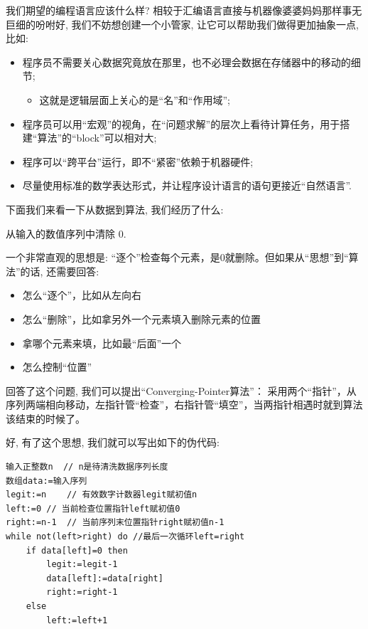 我们期望的编程语言应该什么样? 相较于汇编语言直接与机器像婆婆妈妈那样事无巨细的吩咐好, 我们不妨想创建一个小管家, 让它可以帮助我们做得更加抽象一点, 比如: 

\begin{itemize}
	\item 程序员不需要关心数据究竟放在那里，也不必理会数据在存储器中的移动的细节;
	\begin{itemize}
		\item 这就是逻辑层面上关心的是“名”和“作用域”;
	\end{itemize}
	\item 程序员可以用“宏观”的视角，在“问题求解”的层次上看待计算任务，用于搭建“算法”的“block”可以相对大;
	\item 程序可以“跨平台”运行，即不“紧密”依赖于机器硬件;
	\item 尽量使用标准的数学表达形式，并让程序设计语言的语句更接近“自然语言”. 
\end{itemize}



下面我们来看一下从数据到算法, 我们经历了什么: 

\begin{prob}
	从输入的数值序列中清除 0. 
\end{prob}

一个非常直观的思想是: “逐个”检查每个元素，是0就删除。但如果从“思想”到“算法”的话, 还需要回答: 
\begin{itemize}
	\item 怎么“逐个”，比如从左向右
	\item 怎么“删除”，比如拿另外一个元素填入删除元素的位置
	\item 拿哪个元素来填，比如最“后面”一个
	\item 怎么控制“位置”
\end{itemize}

回答了这个问题, 我们可以提出``Converging-Pointer算法''：
采用两个“指针”，从序列两端相向移动，左指针管“检查”，右指针管“填空”，当两指针相遇时就到算法该结束的时候了。


好, 有了这个思想, 我们就可以写出如下的伪代码: 

\begin{lstlisting}
输入正整数n  // n是待清洗数据序列长度
数组data:=输入序列
legit:=n	// 有效数字计数器legit赋初值n
left:=0	// 当前检查位置指针left赋初值0
right:=n-1	// 当前序列末位置指针right赋初值n-1
while not(left>right) do //最后一次循环left=right
    if data[left]=0 then
        legit:=legit-1
        data[left]:=data[right]
        right:=right-1
    else
        left:=left+1
\end{lstlisting}


